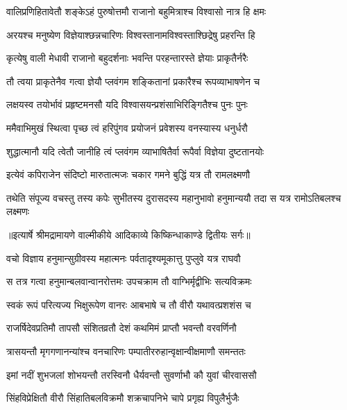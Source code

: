 \twolineshloka
{वालिप्रणिहितावेतौ शङ्केऽहं पुरुषोत्तमौ}
{राजानो बहुमित्राश्च विश्वासो नात्र हि क्षमः} %

\twolineshloka
{अरयश्च मनुष्येण विज्ञेयाश्छन्नचारिणः}
{विश्वस्तानामविश्वस्ताश्छिद्रेषु प्रहरन्ति हि} %

\twolineshloka
{कृत्येषु वाली मेधावी राजानो बहुदर्शनाः}
{भवन्ति परहन्तारस्ते ज्ञेयाः प्राकृतैर्नरैः} %

\twolineshloka
{तौ त्वया प्राकृतेनैव गत्वा ज्ञेयौ प्लवंगम}
{शङ्कितानां प्रकारैश्च रूपव्याभाषणेन च} %

\twolineshloka
{लक्षयस्व तयोर्भावं प्रहृष्टमनसौ यदि}
{विश्वासयन्प्रशंसाभिरिङ्गितैश्च पुनः पुनः} %

\twolineshloka
{ममैवाभिमुखं स्थित्वा पृच्छ त्वं हरिपुंगव}
{प्रयोजनं प्रवेशस्य वनस्यास्य धनुर्धरौ} %

\twolineshloka
{शुद्धात्मानौ यदि त्वेतौ जानीहि त्वं प्लवंगम}
{व्याभाषितैर्वा रूपैर्वा विज्ञेया दुष्टतानयोः} %

\twolineshloka
{इत्येवं कपिराजेन संदिष्टो मारुतात्मजः}
{चकार गमने बुद्धिं यत्र तौ रामलक्ष्मणौ} %

\fourlineindentedshloka
{तथेति संपूज्य वचस्तु तस्य}
{ कपेः सुभीतस्य दुरासदस्य}
{महानुभावो हनुमान्ययौ तदा}
{ स यत्र रामोऽतिबलश्च लक्ष्मणः} %


{॥इत्यार्षे श्रीमद्रामायणे वाल्मीकीये आदिकाव्ये किष्किन्धाकाण्डे द्वितीयः सर्गः॥}


\twolineshloka
{वचो विज्ञाय हनुमान्सुग्रीवस्य महात्मनः}
{पर्वतादृश्यमूकात्तु पुप्लुवे यत्र राघवौ} %

\twolineshloka
{स तत्र गत्वा हनुमान्बलवान्वानरोत्तमः}
{उपचक्राम तौ वाग्भिर्मृद्वीभिः सत्यविक्रमः} %

\twolineshloka
{स्वकं रूपं परित्यज्य भिक्षुरूपेण वानरः}
{आबभाषे च तौ वीरौ यथावत्प्रशशंस च} %

\twolineshloka
{राजर्षिदेवप्रतिमौ तापसौ संशितव्रतौ}
{देशं कथमिमं प्राप्तौ भवन्तौ वरवर्णिनौ} %

\twolineshloka
{त्रासयन्तौ मृगगणानन्यांश्च वनचारिणः}
{पम्पातीररुहान्वृक्षान्वीक्षमाणौ समन्ततः} %

\twolineshloka
{इमां नदीं शुभजलां शोभयन्तौ तरस्विनौ}
{धैर्यवन्तौ सुवर्णाभौ कौ युवां चीरवाससौ} %

\twolineshloka
{सिंहविप्रेक्षितौ वीरौ सिंहातिबलविक्रमौ}
{शक्रचापनिभे चापे प्रगृह्य विपुलैर्भुजैः} %


